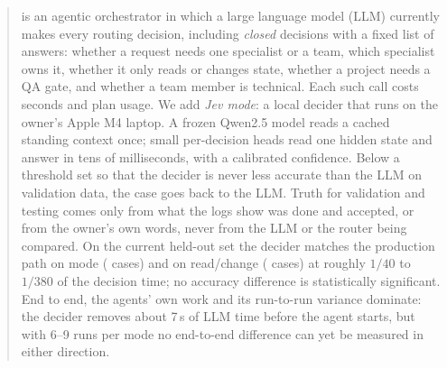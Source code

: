 \begin{abstract}
\sys{} is an agentic orchestrator in which a large language model (LLM) currently makes every routing decision, including \emph{closed} decisions with a fixed list of answers: whether a request needs one specialist or a team, which specialist owns it, whether it only reads or changes state, whether a project needs a QA gate, and whether a team member is technical. Each such call costs seconds and plan usage. We add \emph{Jev mode}: a local decider that runs on the owner's Apple M4 laptop. A frozen Qwen2.5 model reads a cached standing context once; small per-decision heads read one hidden state and answer in tens of milliseconds, with a calibrated confidence. Below a threshold set so that the decider is never less accurate than the LLM on validation data, the case goes back to the LLM. Truth for validation and testing comes only from what the logs show was done and accepted, or from the owner's own words, never from the LLM or the router being compared. On the current held-out set the decider matches the production path on mode (\nDone{} cases) and on read/change (\nStrictDtwo{} cases) at roughly $1/40$ to $1/380$ of the decision time; no accuracy difference is statistically significant. End to end, the agents' own work and its run-to-run variance dominate: the decider removes about 7\,s of LLM time before the agent starts, but with 6--9 runs per mode no end-to-end difference can yet be measured in either direction. \prov{}
\end{abstract}
